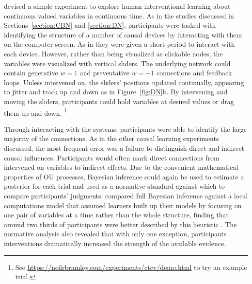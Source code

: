 \documentclass{cambridge7A}%
\begin{document}
\cite{davis2018ctcv} devised a simple experiment to explore human interventional learning about continuous valued variables in continuous time.  As in the studies discussed in Sections~\ref{section:CBN} and \ref{section:DN}, participants were tasked with identifying the structure of a number of causal devices by interacting with them on the computer screen.  As in \cite{bramley2017dynamic} they were given a short period to interact with each device.  However, rather than being visualized as clickable nodes, the variables were visualized with vertical sliders.  The underlying network could contain generative $w=1$ and preventative $w=-1$ connections and feedback loops.  Unless intervened on, the sliders' positions updated continually, %
appearing to jitter and track up and down as in Figure~\ref{fig:DN}b. By intervening and moving the sliders, participants could hold variables at desired values or drag them up and down.%
\footnote{See \url{https://neilrbramley.com/experiments/ctcv/demo.html} to try an example trial.}

Through interacting with the systems, participants were able to identify the large majority of the connections.  As in the other causal learning experiments discussed, the most frequent error was a failure to distinguish direct and indirect causal influences.  Participants would often mark direct connections from intervened on variables to indirect effects.  Due to the convenient mathematical properties of OU processes, Bayesian inference could again be used to estimate a posterior for each trial and used as a normative standard against which to compare participants' judgments.  \cite{davis2018ctcv} compared full Bayesian inference against a local computations model that assumed learners built up their models by focusing on one pair of variables at a time rather than the whole structure, finding that around two thirds of participants were better described by this heuristic \citep[cf][]{fernbach2009causal}.  The normative analysis also revealed that with only one exception, participants interventions dramatically increased the strength of the available evidence.
\end{document}
